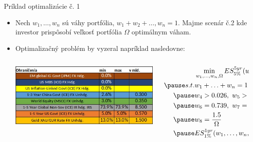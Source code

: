 \documentclass{Bredelebeamer}
\begin{document}
\begin{frame}{Príklad optimalizácie č. 1}
	\begin{itemize}
		\item Nech $w_1, \ldots, w_n$ sú váhy portfólia, $w_1 + w_2 + \ldots, w_n = 1$. Majme scenár č.2 kde investor prispôsobí veľkosť portfólia $\Omega$ optimálnym váham.
		\item Optimalizačný problém by vyzeral napríklad nasledovne:
		\begin{columns}
			\begin{column}{0.48\textwidth}
				\centering
				\includegraphics[width=1.1\textwidth]{Figures/constraints}
			\end{column}
			\begin{column}{0.48\textwidth}
				\[
				\begin{aligned}
				&\min_{w_1, \ldots, w_n, \Omega}ES_{5\%}^{5yr}(w_1, \ldots, w_n, \Omega) \\\pause
				s.t. &w_1 + \ldots + w_n = 1 \\\pause
				&w_4 > 0.026, \ w_5 > 0.03 \\\pause
				&w_6 = 0.739, \ w_7 = 0.05, \ w_8 = 0.13 \\\pause
				&w_8 = \frac{1.5}{\Omega}\\\pause
				&ES_{1\%}^{1yr}(w_1, \ldots, w_n, \Omega) \leq 0.4
				\end{aligned}
				\]
			\end{column}
		\end{columns}
	\end{itemize}
\end{frame}
\end{document}

